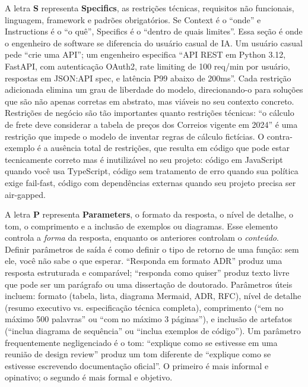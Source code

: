 A letra \textbf{S} representa \textbf{Specifics}, as restrições técnicas,
requisitos não funcionais, linguagem, framework e padrões obrigatórios. Se
Context é o ``onde'' e Instructions é o ``o quê'', Specifics é o ``dentro de
quais limites''. Essa seção é onde o engenheiro de software se diferencia do
usuário casual de IA. Um usuário casual pede ``crie uma API''; um engenheiro
especifica ``API REST em Python 3.12, FastAPI, com autenticação OAuth2, rate
limiting de 100 req/min por usuário, respostas em JSON:API spec, e latência P99
abaixo de 200ms''. Cada restrição adicionada elimina um grau de liberdade do
modelo, direcionando-o para soluções que são não apenas corretas em abstrato, mas
viáveis no seu contexto concreto. Restrições de negócio são tão importantes
quanto restrições técnicas: ``o cálculo de frete deve considerar a tabela de
preços dos Correios vigente em 2024'' é uma restrição que impede o modelo de
inventar regras de cálculo fictícias. O contra-exemplo é a ausência total de
restrições, que resulta em código que pode estar tecnicamente correto mas é
inutilizável no seu projeto: código em JavaScript quando você usa TypeScript,
código sem tratamento de erro quando sua política exige fail-fast, código com
dependências externas quando seu projeto precisa ser air-gapped.

A letra \textbf{P} representa \textbf{Parameters}, o formato da resposta, o nível
de detalhe, o tom, o comprimento e a inclusão de exemplos ou diagramas. Esse
elemento controla a \textit{forma} da resposta, enquanto os anteriores controlam
o \textit{conteúdo}. Definir parâmetros de saída é como definir o tipo de retorno
de uma função: sem ele, você não sabe o que esperar. ``Responda em formato ADR''
produz uma resposta estruturada e comparável; ``responda como quiser'' produz
texto livre que pode ser um parágrafo ou uma dissertação de doutorado. Parâmetros
úteis incluem: formato (tabela, lista, diagrama Mermaid, ADR, RFC), nível de
detalhe (resumo executivo vs. especificação técnica completa), comprimento
(``em no máximo 500 palavras'' ou ``com no máximo 3 páginas''), e inclusão de
artefatos (``inclua diagrama de sequência'' ou ``inclua exemplos de código''). Um
parâmetro frequentemente negligenciado é o tom: ``explique como se estivesse em
uma reunião de design review'' produz um tom diferente de ``explique como se
estivesse escrevendo documentação oficial''. O primeiro é mais informal e
opinativo; o segundo é mais formal e objetivo.

